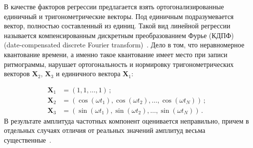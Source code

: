 \begin{multicols}{2}
В качестве факторов регрессии предлагается взять
ортогонализированные единичный и тригонометрические векторы. Под
единичным подразумевается вектор, полностью составленный из
единиц. Такой вид линейной регрессии называется компенсированным
дискретным преобразованием Фурье (КДПФ) (date-compensated discrete
Fourier transform)~\cite{7ma}. Дело в том, что неравномерное квантование
времени, а именно такое квантование имеет место при записи
ритмограммы, нарушает ортогональность и нормировку
тригонометрических векторов $\mathbf{X}_2$, $\mathbf{X}_3$ и
единичного вектора $\mathbf{X}_1$:

\noindent
\begin{align}
\mathbf{X}_1&=(1,1,\ldots,1)\,;\label{trialones}\\
\mathbf{X}_2&=(\cos(\omega t_1),\cos(\omega t_2),\ldots,\cos(\omega
t_N))\,; \label{trialcos}\\
\mathbf{X}_3&=(\sin(\omega t_1),\sin(\omega t_2),\ldots,\sin(\omega
t_N))\,.
\label{trialsin}
\end{align}
В результате амплитуда частотных компонент
оценивается неправильно, причем в отдельных случаях отличия от
реальных значений амплитуд весьма существенные~\cite{8ma}.



\end{multicols}
